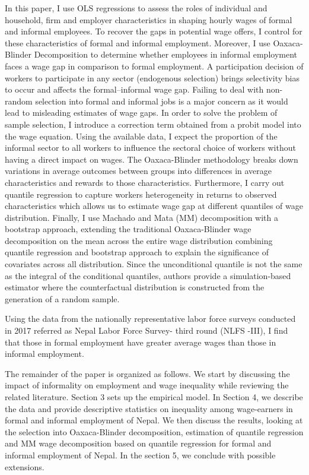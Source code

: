 In this paper, I use OLS regressions to assess the roles of individual and household, firm and employer characteristics in shaping hourly wages of formal and informal employees. To recover the gaps in potential wage offers, I control for these characteristics of formal and informal employment. Moreover, I use Oaxaca-Blinder Decomposition to determine whether employees in informal employment faces a wage gap in comparison to formal employment. A participation decision of workers to participate in any sector (endogenous selection) brings selectivity bias to occur and affects the formal–informal wage gap. Failing to deal with non-random selection into formal and informal jobs is a major concern as it would lead to misleading estimates of wage gaps. In order to solve the problem of sample selection, I introduce a correction term obtained from a probit model into the wage equation. Using the available data, I expect the proportion of the informal sector to all workers to influence the sectoral choice of workers without having a direct impact on wages. The Oaxaca-Blinder methodology breaks down variations in average outcomes between groups into differences in average characteristics and rewards to those characteristics. Furthermore, I carry out quantile regression to capture workers heterogeneity in returns to observed characteristics which allows us to estimate wage gap at different quantiles of wage distribution. Finally, I use Machado and Mata (MM) decomposition with a bootstrap approach, extending the traditional Oaxaca-Blinder wage decomposition on the mean across the entire wage distribution combining quantile regression and bootstrap approach to explain the significance of covariates across all distribution. Since the unconditional quantile is not the same as the integral of the conditional quantiles, authors provide a simulation-based estimator where the counterfactual distribution is constructed from the generation of a random sample.

Using the data from the nationally representative labor force surveys conducted in 2017 referred as Nepal Labor Force Survey- third round (NLFS -III), I find that those in formal employment have greater average wages than those in informal employment. 

The remainder of the paper is organized as follows. We start by discussing the impact of informality on employment and wage inequality while reviewing the related literature. Section 3 sets up the empirical model. In Section 4, we describe the data and provide descriptive statistics on inequality among wage-earners in formal and informal employment of Nepal. We then discuss the results, looking at the selection into Oaxaca-Blinder decomposition, estimation of quantile regression and MM wage decomposition based on quantile regression for formal and informal employment of Nepal. In the section 5, we conclude with possible extensions. 


